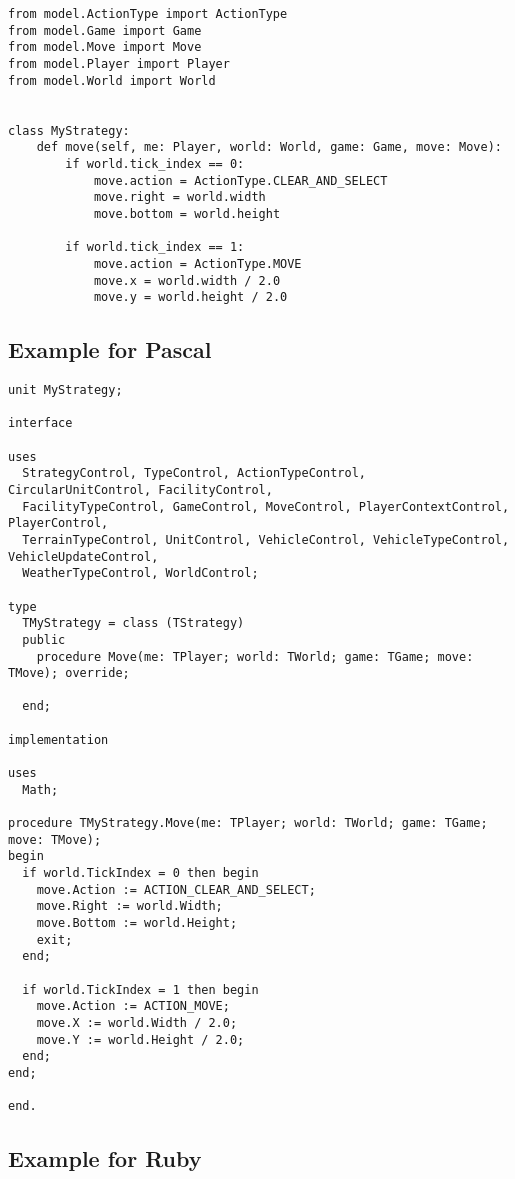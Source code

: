 \begin{verbatim}
from model.ActionType import ActionType
from model.Game import Game
from model.Move import Move
from model.Player import Player
from model.World import World


class MyStrategy:
    def move(self, me: Player, world: World, game: Game, move: Move):
        if world.tick_index == 0:
            move.action = ActionType.CLEAR_AND_SELECT
            move.right = world.width
            move.bottom = world.height

        if world.tick_index == 1:
            move.action = ActionType.MOVE
            move.x = world.width / 2.0
            move.y = world.height / 2.0
\end{verbatim}

\newpage
\subsection{Example for Pascal}

\begin{verbatim}
unit MyStrategy;

interface

uses
  StrategyControl, TypeControl, ActionTypeControl, CircularUnitControl, FacilityControl,
  FacilityTypeControl, GameControl, MoveControl, PlayerContextControl, PlayerControl,
  TerrainTypeControl, UnitControl, VehicleControl, VehicleTypeControl, VehicleUpdateControl,
  WeatherTypeControl, WorldControl;

type
  TMyStrategy = class (TStrategy)
  public
    procedure Move(me: TPlayer; world: TWorld; game: TGame; move: TMove); override;

  end;

implementation

uses
  Math;
    
procedure TMyStrategy.Move(me: TPlayer; world: TWorld; game: TGame; move: TMove);
begin
  if world.TickIndex = 0 then begin
    move.Action := ACTION_CLEAR_AND_SELECT;
    move.Right := world.Width;
    move.Bottom := world.Height;
    exit;
  end;

  if world.TickIndex = 1 then begin
    move.Action := ACTION_MOVE;
    move.X := world.Width / 2.0;
    move.Y := world.Height / 2.0;
  end;
end;

end.
\end{verbatim}

\newpage
\subsection{Example for Ruby}

